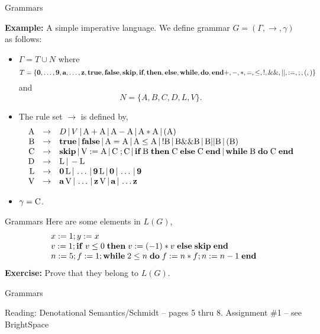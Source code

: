 \documentclass{beamer}
\begin{document}
\begin{frame}[fragile]{Grammars}

\scriptsize
{\bf Example:} A simple imperative language.  We define grammar $G=(\Gamma,\rightarrow,\gamma)$ as follows:
\begin{itemize}
\item $\Gamma = T \cup N$ where
{\tiny
\[
T =\{\mbox{\bf 0},\ldots,\mbox{\bf 9},\mbox{\bf a},\ldots,\mbox{\bf z},\mbox{\bf true},\mbox{\bf false},\mbox{\bf skip},
\mbox{\bf if},\mbox{\bf then},\mbox{\bf else},\mbox{\bf while},\mbox{\bf do},\mbox{\bf end}+,-,*,=,\le,!,\&\&,||,:=,;,(,)\}
\]
}
and
{\tiny
\[
N = \{A,B,C,D,L,V\}.
\]
}
\item The rule set $\rightarrow$ is defined by,
{\tiny
\[
\begin{array}{rcl}
\mbox{A} &\rightarrow& D \,|\, V \,|\, \mbox{A} +\mbox{A} \,|\, \mbox{A} - \mbox{A} \,|\,
	\mbox{A} * \mbox{A}\,|\, ( \mbox{A} )\\

\mbox{B} &\rightarrow& \mbox{\bf true} \,|\, \mbox{\bf false} \,|\, \mbox{A} = \mbox{A} \,|\,
	\mbox{A} \le \mbox{A} \,|\, ! \mbox{B} \,|\, \mbox{B} \&\& \mbox{B} \,|\,
	\mbox{B} || \mbox{B} \,|\, (\mbox{B})\\

\mbox{C} &\rightarrow& \mbox{\bf skip} \,|\, \mbox{V} := \mbox{A} \,|\,\mbox{C}\; ; \mbox{C} \,|\,
	\mbox{\bf if} \; \mbox{B}\; \mbox{\bf then}\;\mbox{C}\; \mbox{\bf else}\; \mbox{C} \; \mbox{\bf end}\,|\,
	\mbox{\bf while}\; \mbox{B}\; \mbox{\bf  do}\; \mbox{C}\; \mbox{\bf end}\\

\mbox{D} &\rightarrow& \mbox{L} \,|\, - \mbox{L}\\

\mbox{L} &\rightarrow& \mbox{\bf 0}\, \mbox{L} \,|\, \ldots \,|\,  \mbox{\bf 9} \,\mbox{L} \,|\, \mbox{\bf 0} \,|\, \ldots\,|\,\mbox{\bf 9}\\

\mbox{V} &\rightarrow& \mbox{\bf a}\,\mbox{V} \,|\, \ldots\,|\, \mbox{\bf z}\,\mbox{V} \,|\, \mbox{\bf a} \,|\, \ldots \mbox{\bf z}
\end{array}
\]
}
\item $\gamma =\mbox{C}$.
\end{itemize}
\end{frame}

\begin{frame}{Grammars}
Here are some elements in $L(G)$,
\[
\begin{array}{l}
x := 1 ; y := x\\
v := 1; {\bf if}\; {v \le 0}\;{\bf then}\;{v := (-1)*v}\;{\bf else}\;{\mbox{\bf skip}}\;\mbox{\bf end}\\
n := 5 ; f := 1 ; {\bf while}\; {2 \le n}\;{\bf do}\;{f := n*f ; n := n - 1}\; \mbox{\bf end}
\end{array}
\]
{\bf Exercise:} Prove that they belong to $L(G)$.

\end{frame}

\begin{frame}{Grammars}

Reading: Denotational Semantics/Schmidt -- pages 5 thru 8.
Assignment \#1 -- see BrightSpace

\end{frame}
\end{document}
